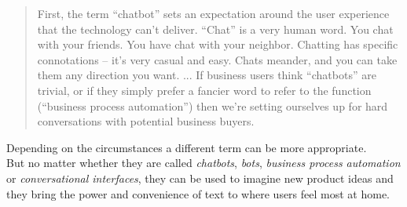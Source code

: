 \begin{quote}
First, the term “chatbot” sets an expectation around the user experience that the technology can’t deliver.
“Chat” is a very human word.
You chat with your friends.
You have chat with your neighbor.
Chatting has specific connotations – it’s very casual and easy.
Chats meander, and you can take them any direction you want.
...
If business users think “chatbots” are trivial, or if they simply prefer a fancier word to refer to the function (“business process automation”) then we’re setting ourselves up for hard conversations with potential business buyers.
\end{quote}

Depending on the circumstances a different term can be more appropriate.
\\

But no matter whether they are called \emph{chatbots}, \emph{bots}, \emph{business process automation} or \emph{conversational interfaces},
they can be used to imagine new product ideas and they bring the power and convenience of text to where users feel most at home.
